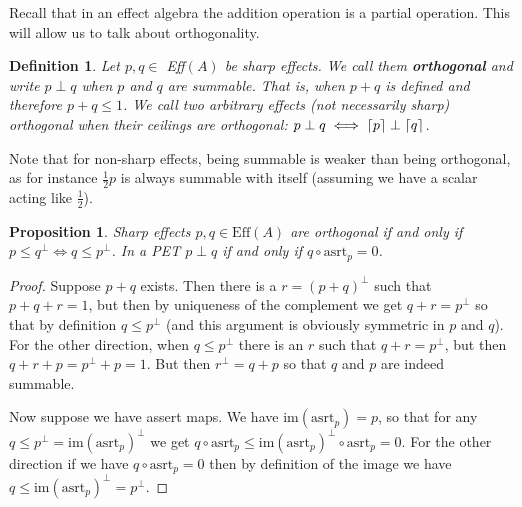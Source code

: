 \documentclass[b5paper,onecolumn,12pt,accepted=2019-05-03, issue=1, volume=1, shorttitle=papers/compositionality-1-1]{compositionalityarticle}
\DeclarePairedDelimiter{\ceil}{\lceil}{\rceil}
\newcounter{counter}
\numberwithin{counter}{section}
\newtheorem{proposition}[counter]{Proposition}
\newtheorem{definition}[counter]{Definition}
\newcommand{\asrt}{\text{asrt}}
\newcommand{\pred}{\text{Eff}}
\newcommand{\im}[1]{\text{im}(#1)}
\begin{document}
\noindent Recall that in an effect algebra the addition operation is a partial operation. This will allow us to talk about orthogonality.
\begin{definition}
	Let $p,q\in$ Eff$(A)$ be sharp effects. We call them \textbf{orthogonal} and write $p\perp q$ when $p$ and $q$ are summable. That is, when $p+q$ is defined and therefore $p+q\leq 1$. We call two arbitrary effects (not necessarily sharp) orthogonal when their ceilings are orthogonal: $p\perp q \iff \ceil{p}\perp \ceil{q}$.
\end{definition}
Note that for non-sharp effects, being summable is weaker than being orthogonal, as for instance $\frac12 p$ is always summable with itself (assuming we have a scalar acting like $\frac12$).
\begin{proposition}\label{prop:orthog}
	Sharp effects $p,q\in\pred(A)$ are orthogonal if and only if $p\leq q^\perp \iff q\leq p^\perp$. In a PET $p\perp q$ if and only if $q\circ \asrt_p = 0$.
\end{proposition}
\begin{proof}
	Suppose $p+q$ exists. Then there is a $r=(p+q)^\perp$ such that $p+q+r = 1$, but then by uniqueness of the complement we get $q+r=p^\perp$ so that by definition $q\leq p^\perp$ (and this argument is obviously symmetric in $p$ and $q$). For the other direction, when $q\leq p^\perp$ there is an $r$ such that $q+r=p^\perp$, but then $q+r+p = p^\perp+p = 1$. But then $r^\perp = q+p$ so that $q$ and $p$ are indeed summable.

	Now suppose we have assert maps. We have $\im{\asrt_p} = p$, so that for any $q\leq p^\perp =\im{\asrt_p}^\perp$ we get $q\circ \asrt_p \leq \im{\asrt_p}^\perp\circ \asrt_p = 0$. For the other direction if we have $q\circ \asrt_p = 0$ then by definition of the image we have $q\leq \im{\asrt_p}^\perp =p^\perp$.
\end{proof}

\end{document}
